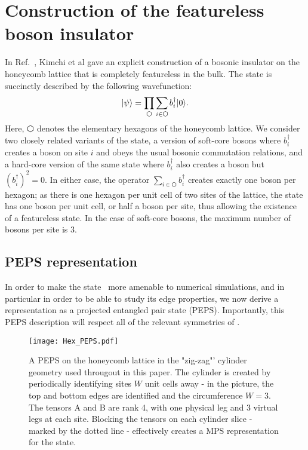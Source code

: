 
\section{Construction of the featureless boson insulator}
\label{sec:fbi}

In Ref.~, Kimchi et al gave an explicit
construction of a bosonic insulator
on the honeycomb lattice that is completely featureless in the bulk.
The state is succinctly described by the following wavefunction:
\begin{equation} \label{eq:def}
\ket{\psi} = \prod\limits_{\varhexagon} \sum\limits_{i \in
\varhexagon} b^{\dagger}_{i} \ket{0}.
\end{equation}
Here, $\varhexagon$ denotes the elementary hexagons of the honeycomb
lattice. We consider two closely related variants of the state, a
version of soft-core bosons where $b_i^\dagger$ creates a boson on
site $i$ and obeys the usual bosonic commutation relations, and a
hard-core version of the same state where $b_i^\dagger$ also creates a
boson but $(b_i^\dagger)^2=0$. In either case, the operator $\sum_{i
\in \varhexagon} b^{\dagger}_{i}$ creates exactly one boson per
hexagon; as there is one hexagon per unit cell of two sites of the
lattice, the state has one boson per unit cell, or half a boson per
site, thus allowing the existence of a featureless state.
In the case of soft-core bosons, the maximum number of bosons
per site is 3.


\subsection{PEPS representation}

In order to make the state~ more amenable to numerical
simulations, and in particular in order to be able to study its edge
properties, we now derive a representation as a projected entangled
pair state (PEPS). Importantly, this PEPS description will respect
all of the relevant symmetries of .

\begin{figure}
	\centering
	\texttt{[image: Hex\_PEPS.pdf]}
	\caption{A PEPS on the honeycomb lattice in the "zig-zag"' cylinder geometry used
	througout in this paper. 
	The cylinder is created by periodically identifying sites $W$ unit cells away 
	- in the picture, the top and bottom edges are identified and the circumference $W=3$. 	
	The tensors A and B are rank 4, with one physical leg and 3 virtual legs at each site. 
	Blocking the tensors on each cylinder slice - marked by the dotted line - effectively 
	creates a MPS representation for the state.
	}
	\label{fig:PEPS}
\end{figure}


